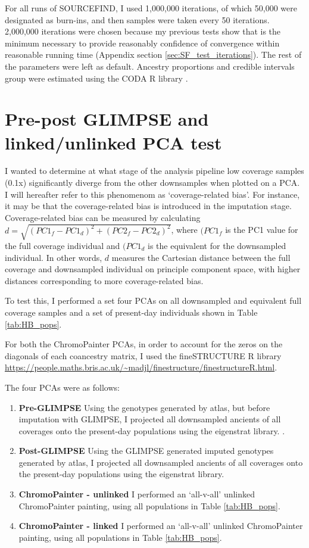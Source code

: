 {For all runs of SOURCEFIND, I used 1,000,000 iterations, of which 50,000 were designated as burn-ins, and then samples were taken every 50 iterations. 2,000,000 iterations were chosen because my previous tests show that is the minimum necessary to provide reasonably confidence of convergence within reasonable running time (Appendix section \ref{sec:SF_test_iterations}). The rest of the parameters were left as default. Ancestry proportions and credible intervals group were estimated using the CODA R library \cite{oro22547}.

\section{Pre-post GLIMPSE and linked/unlinked PCA test}

I wanted to determine at what stage of the analysis pipeline low coverage samples (0.1x) significantly diverge from the other downsamples when plotted on a PCA. I will hereafter refer to this phenomenom as `coverage-related bias'. For instance, it may be that the coverage-related bias is introduced in the imputation stage. Coverage-related bias can be measured by calculating $d = \sqrt{(PC1_{f} - PC1_{d})^2 + (PC2_{f} - PC2_{d})^2}$, where $(PC1_{f}$ is the PC1 value for the full coverage individual and $(PC1_{d}$ is the equivalent for the downsampled individual. In other words, $d$ measures the Cartesian distance between the full coverage and downsampled individual on principle component space, with higher distances corresponding to more coverage-related bias. 

To test this, I performed a set four PCAs on all downsampled and equivalent full coverage samples and a set of present-day individuals shown in Table \ref{tab:HB_pops}.

For both the ChromoPainter PCAs, in order to account for the zeros on the diagonals of each coancestry matrix, I used the fineSTRUCTURE R library \url{https://people.maths.bris.ac.uk/~madjl/finestructure/finestructureR.html}.

The four PCAs were as follows:

\begin{enumerate}
\item \textbf{Pre-GLIMPSE} Using the genotypes generated by atlas, but before imputation with GLIMPSE, I projected all downsampled ancients of all coverages onto the present-day populations using the eigenstrat library. \cite{Price2006}.
\item \textbf{Post-GLIMPSE} Using the GLIMPSE generated imputed genotypes generated by atlas, I projected all downsampled ancients of all coverages onto the present-day populations using the eigenstrat library.
\item \textbf{ChromoPainter - unlinked} I performed an `all-v-all' unlinked ChromoPainter painting, using all populations in Table \ref{tab:HB_pops}. 
\item \textbf{ChromoPainter - linked} I performed an `all-v-all' unlinked ChromoPainter painting, using all populations in Table \ref{tab:HB_pops}.
\end{enumerate}

}
